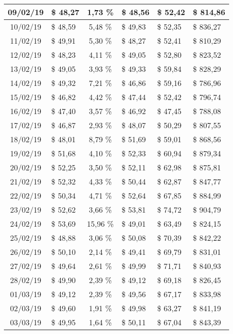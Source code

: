 \begin{center}
\begin{small}
\begin{longtable}{|c|l|c|l|l|l|}
09/02/19 & \$ 48,27 & 1,73 \% & \$ 48,56 & \$ 52,42 & \$ 814,86 \\ \hline
10/02/19 & \$ 48,59 & 5,48 \% & \$ 49,83 & \$ 52,35 & \$ 836,27 \\ \hline
11/02/19 & \$ 49,91 & 5,30 \% & \$ 48,27 & \$ 52,41 & \$ 810,29 \\ \hline
12/02/19 & \$ 48,23 & 4,11 \% & \$ 49,05 & \$ 52,80 & \$ 823,52 \\ \hline
13/02/19 & \$ 49,05 & 3,93 \% & \$ 49,33 & \$ 59,84 & \$ 828,29 \\ \hline
14/02/19 & \$ 49,32 & 7,21 \% & \$ 46,86 & \$ 59,16 & \$ 786,96 \\ \hline
15/02/19 & \$ 46,82 & 4,42 \% & \$ 47,44 & \$ 52,42 & \$ 796,74 \\ \hline
16/02/19 & \$ 47,40 & 3,57 \% & \$ 46,92 & \$ 47,45 & \$ 788,08 \\ \hline
17/02/19 & \$ 46,87 & 2,93 \% & \$ 48,07 & \$ 50,29 & \$ 807,55 \\ \hline
18/02/19 & \$ 48,01 & 8,79 \% & \$ 51,69 & \$ 59,01 & \$ 868,56 \\ \hline
19/02/19 & \$ 51,68 & 4,10 \% & \$ 52,33 & \$ 60,94 & \$ 879,34 \\ \hline
20/02/19 & \$ 52,25 & 3,50 \% & \$ 52,11 & \$ 62,98 & \$ 875,81 \\ \hline
21/02/19 & \$ 52,32 & 4,33 \% & \$ 50,44 & \$ 62,87 & \$ 847,77 \\ \hline
22/02/19 & \$ 50,34 & 4,71 \% & \$ 52,64 & \$ 67,85 & \$ 884,99 \\ \hline
23/02/19 & \$ 52,62 & 3,66 \% & \$ 53,81 & \$ 74,72 & \$ 904,79 \\ \hline
24/02/19 & \$ 53,69 & 15,96 \% & \$ 49,01 & \$ 63,49 & \$ 824,15 \\ \hline
25/02/19 & \$ 48,88 & 3,06 \% & \$ 50,08 & \$ 70,39 & \$ 842,22 \\ \hline
26/02/19 & \$ 50,10 & 2,14 \% & \$ 49,41 & \$ 69,79 & \$ 831,01 \\ \hline
27/02/19 & \$ 49,64 & 2,61 \% & \$ 49,99 & \$ 71,71 & \$ 840,93 \\ \hline
28/02/19 & \$ 49,90 & 2,39 \% & \$ 49,12 & \$ 69,18 & \$ 826,45 \\ \hline
01/03/19 & \$ 49,12 & 2,39 \% & \$ 49,56 & \$ 67,17 & \$ 833,98 \\ \hline
02/03/19 & \$ 49,60 & 1,91 \% & \$ 49,98 & \$ 63,27 & \$ 841,19 \\ \hline
03/03/19 & \$ 49,95 & 1,64 \% & \$ 50,11 & \$ 67,04 & \$ 843,39 \\ \hline

\end{longtable}
\end{small}
\end{center}
